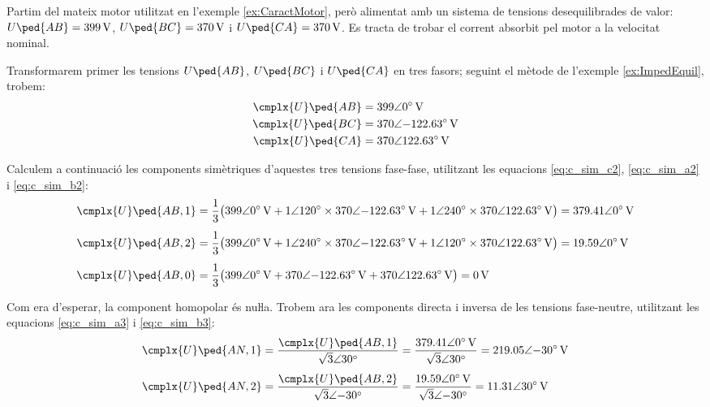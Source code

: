 \begin{exemple}\label{ex:TensDeseqMotor}
	\addcontentsxms{\TensDeseqMotor}
	Partim del mateix motor utilitzat en l'exemple \vref{ex:CaractMotor}, però alimentat amb un sistema de tensions desequilibrades de valor: $U\ped{AB} =
	\qty{399}{V}$, $U\ped{BC} = \qty{370}{V}$ i
	$U\ped{CA} = \qty{370}{V}$. Es tracta de trobar el corrent absorbit pel motor a la velocitat nominal.
	
	Transformarem primer les tensions $U\ped{AB}$, $U\ped{BC}$ i $U\ped{CA}$ en tres fasors; seguint el mètode de l'exemple \vref{ex:ImpedEquil}, trobem:
	\begin{align*}
		\cmplx{U}\ped{AB} &= \complexqty{399:0}{V} \\
		\cmplx{U}\ped{BC} &= \complexqty{370:-122,63}{V} \\
		\cmplx{U}\ped{CA} &= \complexqty{370:122,63}{V}
	\end{align*}
	
	Calculem a continuació les components simètriques d'aquestes tres tensions fase-fase, utilitzant les equacions
	\eqref{eq:c_sim_c2}, \eqref{eq:c_sim_a2} i \eqref{eq:c_sim_b2}:
	\begin{align*}
	\cmplx{U}\ped{AB,1} &= \frac{1}{3} \big(
	\complexqty{399:0}{V} + \complexnum{1:120} \times \complexqty{370:-122,63}{V} +
	\complexnum{1:240} \times \complexqty{370:122,63}{V}\big) = \complexqty{379,41:0}{V} \\[1ex]
	\cmplx{U}\ped{AB,2} &= \frac{1}{3} \big(
	\complexqty{399:0}{V} + \complexnum{1:240} \times \complexqty{370:-122,63}{V} +
	\complexnum{1:120} \times \complexqty{370:122,63}{V} \big) = \complexqty{19,59:0}{V} \\[1ex]
	\cmplx{U}\ped{AB,0} &= \frac{1}{3} \big(
	\complexqty{399:0}{V} + \complexqty{370:-122,63}{V} + \complexqty{370:122,63}{V}\big) = \qty{0}{V}
	\end{align*}
	
	Com era d'esperar, la component homopolar és nuŀla.	 Trobem ara les components directa i inversa
	de les tensions fase-neutre, utilitzant les equacions
	\eqref{eq:c_sim_a3} i \eqref{eq:c_sim_b3}:
	\begin{align*}
	\cmplx{U}\ped{AN,1} &=
	\frac{\cmplx{U}\ped{AB,1}}{\complexnum[parse-numbers=false]{\sqrt{3}:30}} =
	\frac{\complexqty{379,41:0}{V}}{\complexnum[parse-numbers=false]{\sqrt{3}:30}} =
	\complexqty{219,05:-30}{V} \\[1ex]
	\cmplx{U}\ped{AN,2} &=
	\frac{\cmplx{U}\ped{AB,2}}{\complexnum[parse-numbers=false]{\sqrt{3}:-30}} =
	\frac{\complexqty{19,59:0}{V}}{\complexnum[parse-numbers=false]{\sqrt{3}:-30}} =
	\complexqty{11,31:30}{V} 
	\end{align*}
	

\end{exemple}

